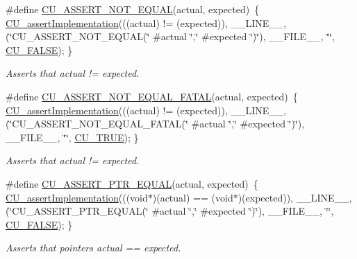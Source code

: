 \begin{DoxyCompactItemize}
\#define \hyperlink{group__Framework_ga7570d2488e79c219c8e2d38a94f47761}{C\-U\-\_\-\-A\-S\-S\-E\-R\-T\-\_\-\-N\-O\-T\-\_\-\-E\-Q\-U\-A\-L}(actual, expected)~\{ \hyperlink{group__Framework_ga31a858e8b496b2af992b63902064c5fa}{C\-U\-\_\-assert\-Implementation}(((actual) != (expected)), \-\_\-\-\_\-\-L\-I\-N\-E\-\_\-\-\_\-, (\char`\"{}C\-U\-\_\-\-A\-S\-S\-E\-R\-T\-\_\-\-N\-O\-T\-\_\-\-E\-Q\-U\-A\-L(\char`\"{} \#actual \char`\"{},\char`\"{} \#expected \char`\"{})\char`\"{}), \-\_\-\-\_\-\-F\-I\-L\-E\-\_\-\-\_\-, \char`\"{}\char`\"{}, \hyperlink{group__Framework_ga7453214541b156ef868681eaafe60860}{C\-U\-\_\-\-F\-A\-L\-S\-E}); \}
\begin{DoxyCompactList}\small\item\em Asserts that actual != expected. \end{DoxyCompactList}\item 
\#define \hyperlink{group__Framework_ga2ca22661a0fc08c8d439d16fb46f00ba}{C\-U\-\_\-\-A\-S\-S\-E\-R\-T\-\_\-\-N\-O\-T\-\_\-\-E\-Q\-U\-A\-L\-\_\-\-F\-A\-T\-A\-L}(actual, expected)~\{ \hyperlink{group__Framework_ga31a858e8b496b2af992b63902064c5fa}{C\-U\-\_\-assert\-Implementation}(((actual) != (expected)), \-\_\-\-\_\-\-L\-I\-N\-E\-\_\-\-\_\-, (\char`\"{}C\-U\-\_\-\-A\-S\-S\-E\-R\-T\-\_\-\-N\-O\-T\-\_\-\-E\-Q\-U\-A\-L\-\_\-\-F\-A\-T\-A\-L(\char`\"{} \#actual \char`\"{},\char`\"{} \#expected \char`\"{})\char`\"{}), \-\_\-\-\_\-\-F\-I\-L\-E\-\_\-\-\_\-, \char`\"{}\char`\"{}, \hyperlink{group__Framework_ga99641394bc766ca9c4a295e942fed1ef}{C\-U\-\_\-\-T\-R\-U\-E}); \}
\begin{DoxyCompactList}\small\item\em Asserts that actual != expected. \end{DoxyCompactList}\item 
\#define \hyperlink{group__Framework_ga1d0b361ec0526cdf40e536847f4bfc6a}{C\-U\-\_\-\-A\-S\-S\-E\-R\-T\-\_\-\-P\-T\-R\-\_\-\-E\-Q\-U\-A\-L}(actual, expected)~\{ \hyperlink{group__Framework_ga31a858e8b496b2af992b63902064c5fa}{C\-U\-\_\-assert\-Implementation}(((void$\ast$)(actual) == (void$\ast$)(expected)), \-\_\-\-\_\-\-L\-I\-N\-E\-\_\-\-\_\-, (\char`\"{}C\-U\-\_\-\-A\-S\-S\-E\-R\-T\-\_\-\-P\-T\-R\-\_\-\-E\-Q\-U\-A\-L(\char`\"{} \#actual \char`\"{},\char`\"{} \#expected \char`\"{})\char`\"{}), \-\_\-\-\_\-\-F\-I\-L\-E\-\_\-\-\_\-, \char`\"{}\char`\"{}, \hyperlink{group__Framework_ga7453214541b156ef868681eaafe60860}{C\-U\-\_\-\-F\-A\-L\-S\-E}); \}
\begin{DoxyCompactList}\small\item\em Asserts that pointers actual == expected. \end{DoxyCompactList}\item 

\end{DoxyCompactItemize}
